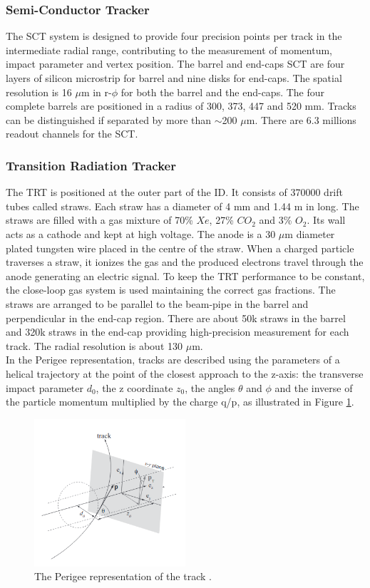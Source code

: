 \subsubsection{Semi-Conductor Tracker}
\label{chap2:ATLAS:ITK:SCT}
The SCT system is designed to provide four precision points per track in the intermediate radial range, contributing to the measurement of momentum, impact parameter and vertex position. The barrel and end-caps SCT are four layers of silicon microstrip for barrel and nine disks for end-caps. The spatial resolution is 16 $\mu$m in r-$\phi$ for both the barrel and the end-caps. The four complete barrels are positioned in a radius of 300, 373, 447 and 520 mm. Tracks can be distinguished if separated by more than $\sim$200 $\mu$m. There are 6.3 millions readout channels for the SCT.

\subsubsection{Transition Radiation Tracker}
The TRT is positioned at the outer part of the ID. It consists of 370000 drift tubes called straws. Each straw has a diameter of 4 mm and 1.44 m in long. The straws are filled with a gas mixture of 70\% $Xe$, 27\% $CO_2$ and 3\% $O_2$. Its wall acts as a cathode and kept at high voltage. The anode is a 30 $\mu$m diameter plated tungsten wire placed in the centre of the straw. When a charged particle traverses a straw, it ionizes the gas and the produced electrons travel through the anode generating an electric signal. To keep the TRT performance to be constant, the close-loop gas system is used maintaining the correct gas fractions. The straws are arranged to be parallel to the beam-pipe in the barrel and perpendicular in the end-cap region. There are about 50k straws in the barrel and 320k straws in the end-cap providing high-precision measurement for each track. The radial resolution is about 130 $\mu$m. \\
In the Perigee representation, tracks are described using the parameters of a helical trajectory at the point of the closest approach to the z-axis: the transverse impact parameter $d_0$, the z coordinate $z_0$, the angles $\theta$ and $\phi$ and the inverse of the particle momentum multiplied by the charge q/p, as illustrated in Figure \ref{fig:chap2:ATLAS:ITK:Trk}.
\begin{figure}[htbp]
    \centering
    \includegraphics[width=0.5\textwidth]{Ch2/Img/Track.png}
    \caption{The Perigee representation of the track \cite{Track_schema}.}
    \label{fig:chap2:ATLAS:ITK:Trk}
\end{figure}

